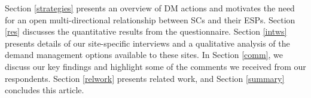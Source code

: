 Section \ref{strategies} presents an overview of DM actions and motivates the need for an open multi-directional relationship between SCs and their ESPs. Section \ref{res} discusses the quantitative results from the questionnaire. Section \ref{intws} presents details of our site-specific interviews and a qualitative analysis of the demand management options available to these sites. In Section \ref{comm}, we discuss our key findings and highlight some of the comments we received from our respondents. Section \ref{relwork} presents related work, and Section \ref{summary} concludes this article.
